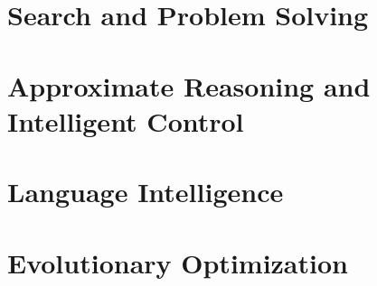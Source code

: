 \documentclass[11pt,oneside,a4paper]{report}
\begin{document}
\utpfrontmatter

\renewcommand{\thechapter}{1A}
\renewcommand{\theHchapter}{setup.1A}


\renewcommand{\thechapter}{1B}
\renewcommand{\theHchapter}{setup.1B}


\setcounter{chapter}{1}
\renewcommand{\thechapter}{\arabic{chapter}}
\renewcommand{\theHchapter}{\arabic{chapter}}

\part{Search and Problem Solving}




\part{Approximate Reasoning and Intelligent Control}



\part{Language Intelligence}



\part{Evolutionary Optimization}

\end{document}
